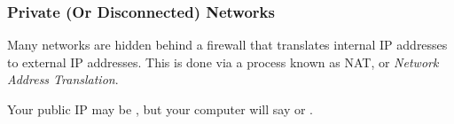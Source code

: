 \subsubsection{Private (Or Disconnected) Networks}
Many networks are hidden behind a firewall that translates internal IP addresses to external IP addresses. This is done via a process known as NAT, or \emph{Network Address Translation}.

Your public IP may be , but your computer will say  or .

